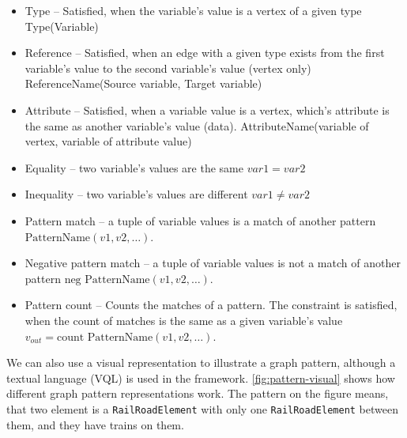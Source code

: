 \begin{itemize}
	\item Type -- Satisfied, when the variable's value is a vertex of a given type
	\newline Type(Variable)
	
	\item Reference -- Satisfied, when an edge with a given type exists from the first variable's value to the second variable's value (vertex only)
	\newline ReferenceName(Source variable, Target variable)
	
	\item Attribute -- Satisfied, when a variable value is a vertex, which's attribute is the same as another variable's value (data).
	\newline AttributeName(variable of vertex, variable of attribute value)
		
	\item Equality -- two variable's values are the same
	\newline $\mathit{var1} = \mathit{var2}$
		
	\item Inequality -- two variable's values are different
	\newline $\mathit{var1} \neq \mathit{var2}$
	
	\item Pattern match -- a tuple of variable values is a match of another pattern	
	\newline $\text{PatternName}(\mathit{v1}, \mathit{v2}, \dots{})$.
	
	\item Negative pattern match -- a tuple of variable values is not a match of another pattern	
	\newline $\text{neg PatternName}(\mathit{v1}, \mathit{v2}, \dots{})$.
	
	\item Pattern count -- Counts the matches of a pattern. The constraint is satisfied, when the count of matches is the same as a given variable's value
	\newline $v_{out} = \text{count PatternName}(\mathit{v1}, \mathit{v2}, \dots{})$.
\end{itemize}

We can also use a visual representation to illustrate a graph pattern, although a textual language (VQL) is used in the framework. 
\autoref{fig:pattern-visual} shows how different graph pattern representations work. The pattern on the figure means, that two element is a \texttt{RailRoadElement} with only one \texttt{RailRoadElement} between them, and they have trains on them.



